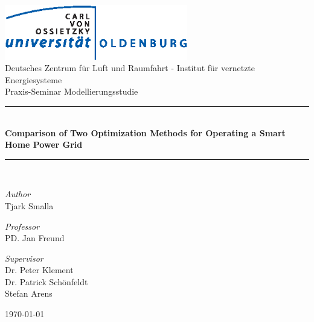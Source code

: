\documentclass[a4paper,12pt]{book}
\theoremstyle{break}
\begin{document}

\begin{titlepage}
\begin{center}

\includegraphics[width=0.6\textwidth]{uol}\\[1cm]

{\large Deutsches Zentrum für Luft und Raumfahrt - Institut für vernetzte Energiesysteme}\\[0.5cm]

{\large Praxis-Seminar Modellierungsstudie}\\[0.5cm]

\rule{\linewidth}{0.5mm} \\[0.4cm]
{ \huge \bfseries Comparison of Two Optimization Methods for Operating a Smart Home Power Grid\\[0.4cm] }
\rule{\linewidth}{0.5mm} \\[1.5cm]

\noindent
\begin{minipage}{0.4\textwidth}
  \begin{flushleft} \large
    \emph{Author}\\
    Tjark Smalla\\
  \end{flushleft}
\end{minipage}%
\begin{minipage}{0.4\textwidth}
  \begin{flushright} \large
    \emph{Professor} \\
    PD. Jan Freund
  \end{flushright}
\end{minipage}

\noindent
\begin{minipage}{0.8\textwidth}
	\begin{flushright} \large
		\vspace{\baselineskip}
		\emph{Supervisor} \\
		Dr. Peter Klement \\
		Dr. Patrick Schönfeldt \\
		Stefan Arens
	\end{flushright}
\end{minipage}

\vfill

{\large \today}

\end{center}
\end{titlepage}
\end{document}
